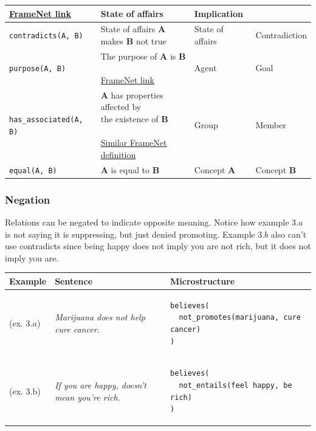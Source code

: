 \begin{footnotesize}
\begin{tabular}{lp{5cm}p{2.5cm}p{3cm}}
{\href{https://framenet2.icsi.berkeley.edu/fnReports/data/frameIndex.xml?frame=Evidence}
{FrameNet link}
}
& State of affairs & Implication \\
\midrule
\texttt{contradicts(A, B)} & 
\makecell[cl]{
State of affairs \textbf{A} \\
makes \textbf{B} not true}
& State of affairs & Contradiction \\
\midrule
\texttt{purpose(A, B)} & 
\makecell[cl]{The purpose of \textbf{A} is \textbf{B} \\\\
\href{https://framenet2.icsi.berkeley.edu/fnReports/data/frameIndex.xml?frame=Purpose
}{FrameNet link}
} & Agent & Goal \\
\midrule
\texttt{has\_associated(A, B)} &
\makecell[cl]{
\textbf{A} has properties affected by \\
the existence of \textbf{B} \\\\
\href{https://framenet2.icsi.berkeley.edu/fnReports/data/frameIndex.xml?frame=Membership
}
{Similar FrameNet definition} 
} & Group & Member \\
\midrule
\texttt{equal(A, B)} & \textbf{A} is equal to \textbf{B} & Concept \textbf{A} & Concept \textbf{B} \\
\bottomrule
\end{tabular}
\end{footnotesize}

\subsubsection{Negation}

Relations can be negated to indicate opposite meaning. Notice how example $3.a$
is not saying it is suppressing, but just denied promoting. Example $3.b$ also can’t
use contradicts since being happy does not imply you are not rich, but it does
not imply you are.

\begin{footnotesize}
\begin{tabular}{@{}m{1.5cm} m{5cm} m{8cm}}
\toprule
Example & Sentence & Microstructure \\
\midrule
(ex. $3.a$) & \textit{Marijuana does not help cure cancer. } & 
\begin{verbatim}
believes(
  not_promotes(marijuana, cure cancer)
)
\end{verbatim}
\\
(ex. 3.b) & \textit{If you are happy, doesn’t mean you’re rich.} 
 &
\begin{verbatim}
believes(
  not_entails(feel happy, be rich)
)
\end{verbatim} 
\\
\bottomrule
\end{tabular}
\end{footnotesize}

